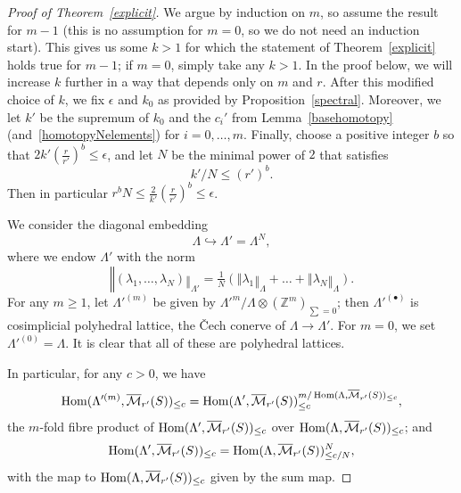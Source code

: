 \begin{proof}[Proof of Theorem~\ref{explicit}]
  We argue by induction on $m$, so assume the result for $m-1$
  (this is no assumption for $m=0$, so we do not need an induction start).
  This gives us some $k>1$ for which the statement of Theorem~\ref{explicit} holds true for $m-1$;
  if $m=0$, simply take any $k>1$.
  In the proof below, we will increase $k$ further in a way that depends only on $m$ and $r$.
  After this modified choice of $k$, we fix $\epsilon$ and $k_0$ as provided by Proposition~\ref{spectral}.
  Moreover, we let $k'$ be the supremum of $k_0$ and the $c_i'$ from
  Lemma~\ref{basehomotopy} (and~\ref{homotopyNelements}) for $i=0,\ldots,m$.
  Finally, choose a positive integer $b$ so that $2k'(\tfrac r{r'})^b\leq \epsilon$,
  and let $N$ be the minimal power of $2$ that satisfies
\[
k'/N\leq (r')^b.
\]
Then in particular $r^bN\leq \frac 2{k'}(\tfrac{r}{r'})^b\leq \epsilon$.

We consider the diagonal embedding
\[
\Lambda\hookrightarrow \Lambda' = \Lambda^N,
\]
where we endow $\Lambda'$ with the norm
\[
‖(\lambda_1,\ldots,\lambda_N)‖_{\Lambda'} = \tfrac 1N(‖\lambda_1‖_\Lambda+\ldots+‖\lambda_N‖_\Lambda).
\]
For any $m\geq 1$, let $\Lambda'^{(m)}$ be given by $\Lambda'^m / \Lambda\otimes (\mathbb Z^m)_{\sum=0}$; then $\Lambda'^{(\bullet)}$ is cosimplicial polyhedral lattice, the \v{C}ech conerve of $\Lambda\to \Lambda'$. For $m=0$, we set $\Lambda'^{(0)} = \Lambda$. It is clear that all of these are polyhedral lattices.

In particular, for any $c>0$, we have
\[
\operatorname{Hom}(\Lambda'^{(m)},\overline{\mathcal M}_{r'}(S))_{\leq c} = \operatorname{Hom}(\Lambda',\overline{\mathcal M}_{r'}(S))_{\leq c}^{m/\operatorname{Hom}(\Lambda,\overline{\mathcal M}_{r'}(S))_{\leq c}},
\]
the $m$-fold fibre product of $\operatorname{Hom}(\Lambda',\overline{\mathcal M}_{r'}(S))_{\leq c}$ over $\operatorname{Hom}(\Lambda,\overline{\mathcal M}_{r'}(S))_{\leq c}$; and
\[
\operatorname{Hom}(\Lambda',\overline{\mathcal M}_{r'}(S))_{\leq c} = \operatorname{Hom}(\Lambda,\overline{\mathcal M}_{r'}(S))_{\leq c/N}^N,
\]
with the map to $\operatorname{Hom}(\Lambda,\overline{\mathcal M}_{r'}(S))_{\leq c}$ given by the sum map.


\end{proof}
